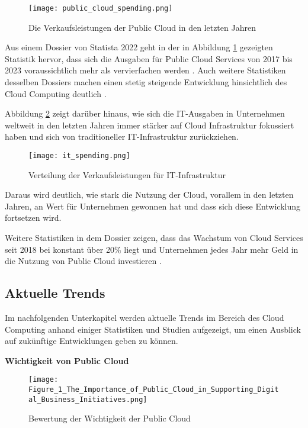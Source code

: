 \begin{figure}[H]
    \texttt{[image: public\_cloud\_spending.png]}
    \caption{Die Verkaufsleistungen der Public Cloud in den letzten Jahren \cite[S. 8]{Statista2022}}
    \label{fig:public_cloud_spending}
\end{figure}

Aus einem Dossier von Statista 2022 geht in der in Abbildung \ref{fig:public_cloud_spending} gezeigten Statistik hervor, dass sich die Ausgaben für Public Cloud Services von 2017 bis 2023 voraussichtlich mehr als vervierfachen werden \cite[Vgl.][S. 8]{Statista2022}. Auch weitere Statistiken desselben Dossiers machen einen stetig steigende Entwicklung hinsichtlich des Cloud Computing deutlich \cite[Vgl. unter anderem][S. 11ff]{Statista2022}. \pagebreak

Abbildung \ref{fig:it-spending} zeigt darüber hinaus, wie sich die IT-Ausgaben in Unternehmen weltweit in den letzten Jahren immer stärker auf Cloud Infrastruktur fokussiert haben und sich von traditioneller IT-Infrastruktur zurückziehen.

\begin{figure}[H]
    \texttt{[image: it\_spending.png]}
    \caption{Verteilung der Verkaufsleistungen für IT-Infrastruktur \cite[S. 7]{Statista2022}}
    \label{fig:it-spending}
\end{figure}

Daraus wird deutlich, wie stark die Nutzung der Cloud, vorallem in den letzten Jahren, an Wert für Unternehmen gewonnen hat und dass sich diese Entwicklung fortsetzen wird.

Weitere Statistiken in dem Dossier zeigen, dass das Wachstum von Cloud Services seit 2018 bei konstant über 20\% liegt \cite[Vgl.][S. 6]{Statista2022} und Unternehmen jedes Jahr mehr Geld in die Nutzung von Public Cloud investieren \cite[Vgl.][S. 31f]{Statista2022}. \pagebreak

\subsection{Aktuelle Trends}
Im nachfolgenden Unterkapitel werden aktuelle Trends im Bereich des Cloud Computing anhand einiger Statistiken und Studien aufgezeigt, um einen Ausblick auf zukünftige Entwicklungen geben zu können.

\textbf{Wichtigkeit von Public Cloud}

\begin{figure}[H]
    \texttt{[image: Figure\_1\_The\_Importance\_of\_Public\_Cloud\_in\_Supporting\_Digital\_Business\_Initiatives.png]}
    \caption{Bewertung der Wichtigkeit der Public Cloud \cite[S. 2]{Ganly2022}}
    \label{fig:importance}
\end{figure}


